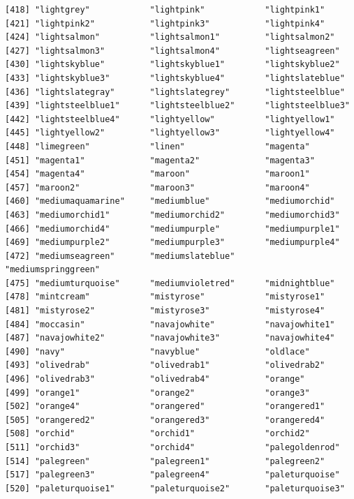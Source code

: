 \documentclass[a4paperpaper,]{article}
\theoremstyle{definition}
\theoremstyle{definition}
\theoremstyle{definition}
\theoremstyle{remark}
\begin{document}
\begin{verbatim}
[418] "lightgrey"            "lightpink"            "lightpink1"          
[421] "lightpink2"           "lightpink3"           "lightpink4"          
[424] "lightsalmon"          "lightsalmon1"         "lightsalmon2"        
[427] "lightsalmon3"         "lightsalmon4"         "lightseagreen"       
[430] "lightskyblue"         "lightskyblue1"        "lightskyblue2"       
[433] "lightskyblue3"        "lightskyblue4"        "lightslateblue"      
[436] "lightslategray"       "lightslategrey"       "lightsteelblue"      
[439] "lightsteelblue1"      "lightsteelblue2"      "lightsteelblue3"     
[442] "lightsteelblue4"      "lightyellow"          "lightyellow1"        
[445] "lightyellow2"         "lightyellow3"         "lightyellow4"        
[448] "limegreen"            "linen"                "magenta"             
[451] "magenta1"             "magenta2"             "magenta3"            
[454] "magenta4"             "maroon"               "maroon1"             
[457] "maroon2"              "maroon3"              "maroon4"             
[460] "mediumaquamarine"     "mediumblue"           "mediumorchid"        
[463] "mediumorchid1"        "mediumorchid2"        "mediumorchid3"       
[466] "mediumorchid4"        "mediumpurple"         "mediumpurple1"       
[469] "mediumpurple2"        "mediumpurple3"        "mediumpurple4"       
[472] "mediumseagreen"       "mediumslateblue"      "mediumspringgreen"   
[475] "mediumturquoise"      "mediumvioletred"      "midnightblue"        
[478] "mintcream"            "mistyrose"            "mistyrose1"          
[481] "mistyrose2"           "mistyrose3"           "mistyrose4"          
[484] "moccasin"             "navajowhite"          "navajowhite1"        
[487] "navajowhite2"         "navajowhite3"         "navajowhite4"        
[490] "navy"                 "navyblue"             "oldlace"             
[493] "olivedrab"            "olivedrab1"           "olivedrab2"          
[496] "olivedrab3"           "olivedrab4"           "orange"              
[499] "orange1"              "orange2"              "orange3"             
[502] "orange4"              "orangered"            "orangered1"          
[505] "orangered2"           "orangered3"           "orangered4"          
[508] "orchid"               "orchid1"              "orchid2"             
[511] "orchid3"              "orchid4"              "palegoldenrod"       
[514] "palegreen"            "palegreen1"           "palegreen2"          
[517] "palegreen3"           "palegreen4"           "paleturquoise"       
[520] "paleturquoise1"       "paleturquoise2"       "paleturquoise3"      

\end{verbatim}
\end{document}
